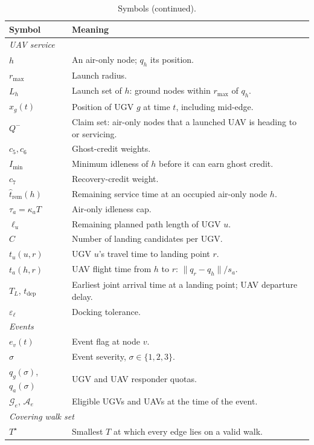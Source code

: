 \documentclass[11pt]{article}
\theoremstyle{definition}
\theoremstyle{plain}
\begin{document}
\begin{table}[H]
\centering
\small
\caption*{Symbols (continued).}
\begin{tabularx}{\linewidth}{lX}
\toprule
Symbol & Meaning \\
\midrule
\multicolumn{2}{l}{\textit{UAV service}} \\
$h$ & An air-only node; $q_h$ its position. \\
$r_{\max}$ & Launch radius. \\
$L_h$ & Launch set of $h$: ground nodes within $r_{\max}$ of $q_h$. \\
$x_g(t)$ & Position of UGV $g$ at time $t$, including mid-edge. \\
$Q^-$ & Claim set: air-only nodes that a launched UAV is heading to or servicing. \\
$c_5, c_6$ & Ghost-credit weights. \\
$I_{\min}$ & Minimum idleness of $h$ before it can earn ghost credit. \\
$c_7$ & Recovery-credit weight. \\
$\hat t_{\mathrm{rem}}(h)$ & Remaining service time at an occupied air-only node $h$. \\
$\tau_a = \kappa_a T$ & Air-only idleness cap. \\
$\ell_u$ & Remaining planned path length of UGV $u$. \\
$C$ & Number of landing candidates per UGV. \\
$t_u(u, r)$ & UGV $u$'s travel time to landing point $r$. \\
$t_a(h, r)$ & UAV flight time from $h$ to $r$: $\|q_r - q_h\| / s_a$. \\
$T_L$, $t_{\mathrm{dep}}$ & Earliest joint arrival time at a landing point; UAV departure delay. \\
$\varepsilon_\ell$ & Docking tolerance. \\
\multicolumn{2}{l}{\textit{Events}} \\
$e_v(t)$ & Event flag at node $v$. \\
$\sigma$ & Event severity, $\sigma \in \{1, 2, 3\}$. \\
$q_g(\sigma)$, $q_a(\sigma)$ & UGV and UAV responder quotas. \\
$\mathcal{G}_e$, $\mathcal{A}_e$ & Eligible UGVs and UAVs at the time of the event. \\
\multicolumn{2}{l}{\textit{Covering walk set}} \\
$T^\star$ & Smallest $T$ at which every edge lies on a valid walk. \\

\end{tabularx}
\end{table}
\end{document}
